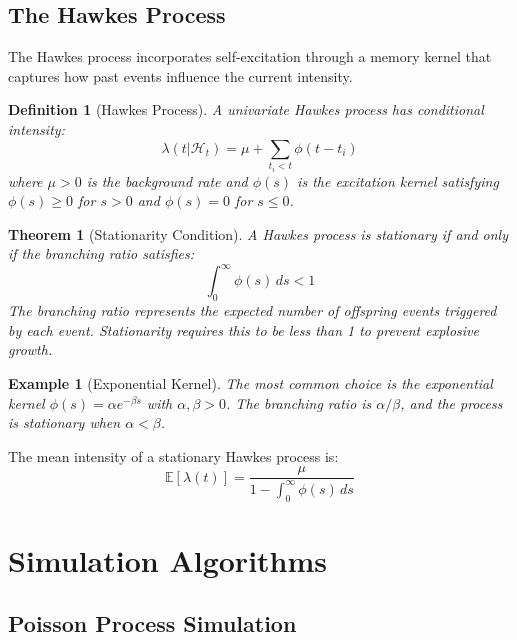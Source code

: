 \documentclass[a4paper, 11pt]{article}
\newtheorem{definition}{Definition}[section]
\newtheorem{theorem}{Theorem}[section]
\newtheorem{example}{Example}[section]
\begin{document}
\subsection{The Hawkes Process}

The Hawkes process incorporates self-excitation through a memory kernel that captures
how past events influence the current intensity.

\begin{definition}[Hawkes Process]
A univariate Hawkes process has conditional intensity:
\begin{equation}
\lambda(t|\mathcal{H}_t) = \mu + \sum_{t_i < t} \phi(t - t_i)
\end{equation}
where $\mu > 0$ is the background rate and $\phi(s)$ is the excitation kernel
satisfying $\phi(s) \geq 0$ for $s > 0$ and $\phi(s) = 0$ for $s \leq 0$.
\end{definition}

\begin{theorem}[Stationarity Condition]
A Hawkes process is stationary if and only if the branching ratio satisfies:
\begin{equation}
\int_0^\infty \phi(s) \, ds < 1
\end{equation}
The branching ratio represents the expected number of offspring events triggered
by each event. Stationarity requires this to be less than 1 to prevent explosive growth.
\end{theorem}

\begin{example}[Exponential Kernel]
The most common choice is the exponential kernel $\phi(s) = \alpha e^{-\beta s}$
with $\alpha, \beta > 0$. The branching ratio is $\alpha/\beta$, and the process
is stationary when $\alpha < \beta$.
\end{example}

The mean intensity of a stationary Hawkes process is:
\begin{equation}
\mathbb{E}[\lambda(t)] = \frac{\mu}{1 - \int_0^\infty \phi(s) \, ds}
\end{equation}

\section{Simulation Algorithms}

\subsection{Poisson Process Simulation}
\end{document}
